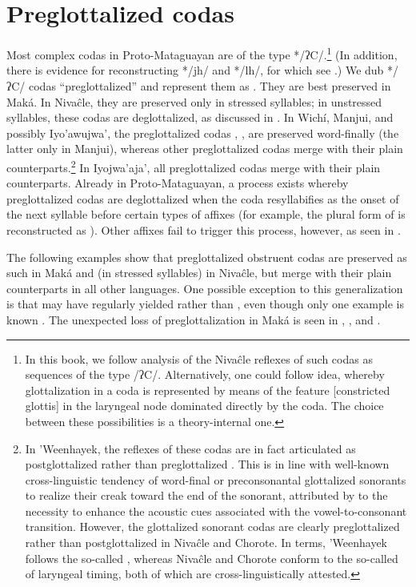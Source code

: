 \section{Preglottalized codas}\label{glott-codas}
Most complex codas in Proto-Mataguayan are of the type */ʔC/.\footnote{In this book, we follow  analysis of the Nivaĉle reflexes of such codas as sequences of the type /ʔC/. Alternatively, one could follow  idea, whereby glottalization in a coda is represented by means of the feature [constricted glottis] in the laryngeal node dominated directly by the coda. The choice between these possibilities is a theory-internal one.} (In addition, there is evidence for reconstructing */jh/ and */lh/, for which see .) We dub */ʔC/ codas ``preglottalized'' and represent them as . They are best preserved in Maká. In Nivaĉle, they are preserved only in stressed syllables; in unstressed syllables, these codas are deglottalized, as discussed in . In Wichí, Manjui, and possibly Iyo’awujwa’, the preglottalized codas , ,  are preserved word-finally (the latter only in Manjui), whereas other preglottalized codas merge with their plain counterparts.\footnote{In ’Weenhayek, the reflexes of these codas are in fact articulated as postglottalized rather than preglottalized \citep[33–35]{KC94}. This is in line with well-known cross-linguistic tendency of word-final or preconsonantal glottalized sonorants to realize their creak toward the end of the sonorant, attributed by \citet[394–396]{MGPL01} to the necessity to enhance the acoustic cues associated with the vowel-to-consonant transition. However, the glottalized sonorant codas are clearly preglottalized rather than postglottalized in Nivaĉle and Chorote. In  terms, ’Weenhayek follows the so-called , whereas Nivaĉle and Chorote conform to the so-called  of laryngeal timing, both of which are cross-linguistically attested.} In Iyojwa’aja’, all preglottalized codas merge with their plain counterparts. Already in Proto-Mataguayan, a process exists whereby preglottalized codas are deglottalized when the coda resyllabifies as the onset of the next syllable before certain types of affixes (for example, the plural form of  is reconstructed as ). Other affixes fail to trigger this process, however, as seen in .

The following examples show that preglottalized obstruent codas are preserved as such in Maká and (in stressed syllables) in Nivaĉle, but merge with their plain counterparts in all other languages. One possible exception to this generalization is that  may have regularly yielded  rather than , even though only one example is known . The unexpected loss of preglottalization in Maká is seen in , , and .

